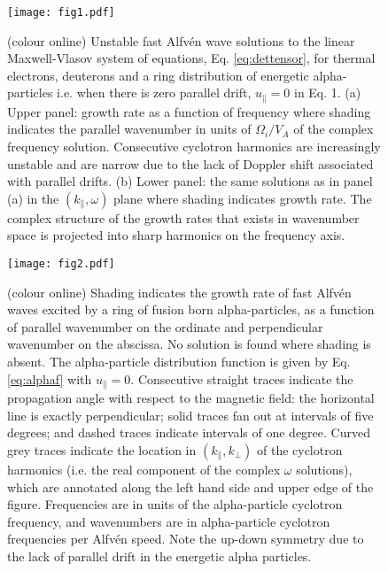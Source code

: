 \documentclass[12pt]{iopart}
\begin{document}
\begin{figure}[ht!]
    \raggedleft
\texttt{[image: fig1.pdf]}
    \caption{(colour online) Unstable fast Alfv{\'e}n wave solutions to the
    linear Maxwell-Vlasov system of equations, Eq. \ref{eq:dettensor}, for
    thermal electrons, deuterons and a ring distribution of energetic
    alpha-particles i.e. when there is zero parallel drift, $u_\parallel=0$ in
    Eq. 1. (a) Upper panel: growth rate as a function of frequency where shading
    indicates the parallel wavenumber in units of $\Omega_i/V_A$ of the complex frequency solution. Consecutive cyclotron harmonics are increasingly unstable and are narrow due to the lack of Doppler shift associated with parallel drifts. (b) Lower panel: the same solutions as in panel (a) in the $(k_\parallel,\omega)$ plane where shading indicates growth rate. The complex structure of the growth rates that exists in wavenumber space is projected into sharp harmonics on the frequency axis.}
    \label{fig:2D_F12_zeropitch}
\end{figure}


\begin{figure}[ht!]
    \raggedleft
\texttt{[image: fig2.pdf]}
    \caption{(colour online) Shading indicates the growth rate of fast Alfv{\'e}n waves excited by a ring of fusion born alpha-particles, as a function of parallel wavenumber on the ordinate and perpendicular wavenumber on the abscissa. No solution is found where shading is absent. The alpha-particle distribution function is given by Eq. \ref{eq:alphaf} with $u_{\parallel} = 0$. Consecutive straight traces indicate the propagation angle with respect to the magnetic field: the horizontal line is exactly perpendicular; solid traces fan out at intervals of five degrees; and dashed traces indicate intervals of one degree. Curved grey traces indicate the location in $(k_\parallel, k_\perp)$ of the cyclotron harmonics (i.e. the real component of the complex $\omega$ solutions), which are annotated along the left hand side and upper edge of the figure. Frequencies are in units of the alpha-particle cyclotron frequency, and wavenumbers are in alpha-particle cyclotron frequencies per Alfv{\'e}n speed. Note the up-down symmetry due to the lack of parallel drift in the energetic alpha particles.}
    \label{fig:2D_imag_zeropitch}
\end{figure}
\end{document}
